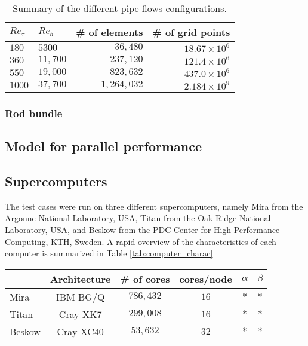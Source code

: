 \documentclass{sig-alternate}
\begin{document}
\begin{table}
\centering
\caption{Summary of the different pipe flows configurations.}
\begin{tabular}{llrr} 
\hline
$Re_{\tau}$&$Re_{b}$&\# of elements & \# of grid points\\ 
\hline
$180$ & $5300$ & $36,480$ & $18.67 \times 10^6$\\
$360$ & $11,700$ & $237,120$ & $121.4 \times 10^6$\\ 
$550$ & $19,000$ & $823,632$ & $437.0 \times 10^6$\\ 
$1000$ & $37,700$ & $1,264,032$ & $2.184 \times 10^9$\\
\hline
\end{tabular}
\label{tab:pipe_conf}
\end{table}

\subsubsection{Rod bundle}

\subsection{Model for parallel performance}

\subsection{Supercomputers}

The test cases were run on three different supercomputers, namely Mira from the Argonne National Laboratory, USA, Titan from the Oak Ridge National Laboratory, USA, and Beskow from the PDC Center for High Performance Computing, KTH, Sweden. A rapid overview of the characteristics of each computer is summarized in Table \ref{tab:computer_charac}

\begin{table*}
\centering
\caption{Overview of the characteristics of the different supercomputers.}
\begin{tabular}{l|ccccc} 
\hline
 & Architecture & \# of cores & cores/node & $\alpha$ & $\beta$\\
 \hline
Mira & IBM BG/Q & $786,432$ & $16$ & $*$ & $*$\\ 
Titan & Cray XK7 & $299,008$ & $16$ & $*$ & $*$\\ 
Beskow & Cray XC40 & $53,632$ & $32$ & $*$ & $*$\\
\hline
\end{tabular}
\label{tab:computer_charac}
\end{table*}
\end{document}
